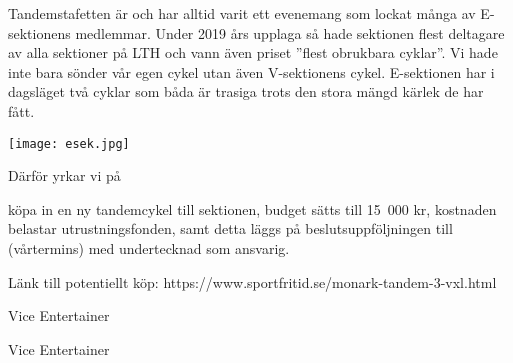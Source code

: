 \documentclass[../_main/handlingar.tex]{subfiles}
\begin{document}

Tandemstafetten är och har alltid varit ett evenemang som lockat många av E-sektionens
medlemmar. Under 2019 års upplaga så hade sektionen flest deltagare av alla sektioner på
LTH och vann även priset ”flest obrukbara cyklar”. Vi hade inte bara sönder vår egen cykel
utan även V-sektionens cykel. E-sektionen har i dagsläget två cyklar som båda är trasiga trots
den stora mängd kärlek de har fått.

\begin{center}
    \texttt{[image: esek.jpg]}
\end{center}

Därför yrkar vi på
\begin{attsatser}
    \att köpa in en ny tandemcykel till sektionen,
    \att budget sätts till 15 000 kr,
    \att kostnaden belastar utrustningsfonden, samt
    \att detta läggs på beslutsuppföljningen till (vårtermins) med undertecknad som ansvarig.
\end{attsatser}

Länk till potentiellt köp: https://www.sportfritid.se/monark-tandem-3-vxl.html

\begin{signatures}{2}
    \mvh
    \signature{Simon Mahdavi}{Vice Entertainer}
    \signature{Casper Schwerin}{Vice Entertainer}
\end{signatures}
\end{document}
